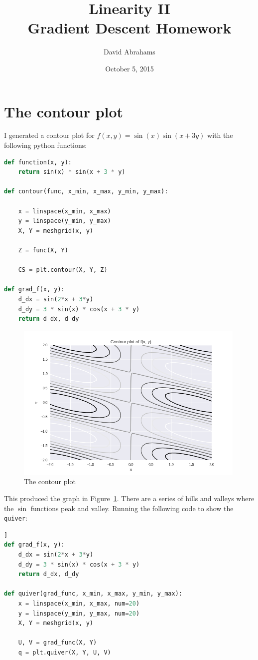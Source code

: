 \documentclass[]{article}
\title{Linearity II\\Gradient Descent Homework}
\date{October 5, 2015}
\author{David Abrahams}
\begin{document}
\maketitle

\section{The contour plot}

I generated a contour plot for $f(x, y) = \sin(x)\sin(x + 3y)$ with the following python functions:

\begin{lstlisting}[language=Python, frame=single]
def function(x, y):
    return sin(x) * sin(x + 3 * y)

def contour(func, x_min, x_max, y_min, y_max):

    x = linspace(x_min, x_max)
    y = linspace(y_min, y_max)
    X, Y = meshgrid(x, y)

    Z = func(X, Y)

    CS = plt.contour(X, Y, Z)

def grad_f(x, y):
    d_dx = sin(2*x + 3*y)
    d_dy = 3 * sin(x) * cos(x + 3 * y)
    return d_dx, d_dy
\end{lstlisting}

\begin{figure}
\centering
\includegraphics[height=3in]{../img/contour.png}
\caption{The contour plot}
\label{fig:contour}
\end{figure}

This produced the graph in Figure~\ref{fig:contour}. There are a series of hills and valleys where the $\sin$ functions peak and valley. Running the following code to show the \texttt{quiver}:

\begin{lstlisting}[language=Python, frame=single]]
def grad_f(x, y):
    d_dx = sin(2*x + 3*y)
    d_dy = 3 * sin(x) * cos(x + 3 * y)
    return d_dx, d_dy

def quiver(grad_func, x_min, x_max, y_min, y_max):
    x = linspace(x_min, x_max, num=20)
    y = linspace(y_min, y_max, num=20)
    X, Y = meshgrid(x, y)

    U, V = grad_func(X, Y)
    q = plt.quiver(X, Y, U, V)
\end{lstlisting}
\end{document}
